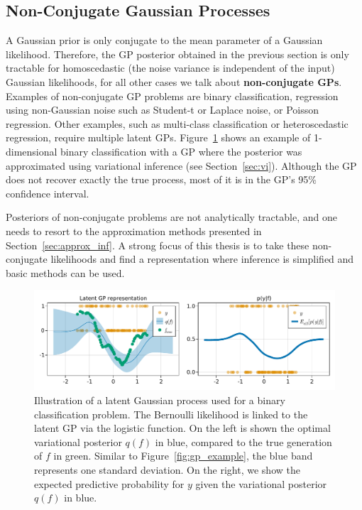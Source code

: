 \subsection{Non-Conjugate Gaussian Processes}
\label{sec:nonconj_gps}
A Gaussian prior is only conjugate to the mean parameter of a Gaussian likelihood.
Therefore, the \ac{GP} posterior obtained in the previous section is only tractable for homoscedastic (the noise variance is independent of the input) Gaussian likelihoods, for all other cases we talk about \textbf{non-conjugate \ac{GPs}}.
Examples of non-conjugate \ac{GP} problems are binary classification, regression using non-Gaussian noise such as Student-t or Laplace noise, or Poisson regression.
Other examples, such as multi-class classification or heteroscedastic regression, require multiple latent \ac{GPs}.
Figure~\ref{fig:gp_class_example} shows an example of 1-dimensional binary classification with a \ac{GP} where the posterior was approximated using variational inference (see Section~\ref{sec:vi}).
Although the \ac{GP} does not recover exactly the true process, most of it is in the \ac{GP}'s 95\% confidence interval.

Posteriors of non-conjugate problems are not analytically tractable, and one needs to resort to the approximation methods presented in Section~\ref{sec:approx_inf}.
A strong focus of this thesis is to take these non-conjugate likelihoods and find a representation where inference is simplified and basic methods can be used.

\begin{figure}
    \includegraphics[width=\textwidth]{./chapters/2_background/figures/GP_classification_example.pdf}
    \caption{Illustration of a latent Gaussian process used for a binary classification problem.
    The Bernoulli likelihood is linked to the latent \ac{GP} via the logistic function.
    On the left is shown the optimal variational posterior $q(f)$ in blue, compared to the true generation of $f$ in green.
    Similar to Figure~\ref{fig:gp_example}, the blue band represents one standard deviation.
    On the right, we show the expected predictive probability for $y$ given the variational posterior $q(f)$ in blue.}
    \label{fig:gp_class_example}
\end{figure}

